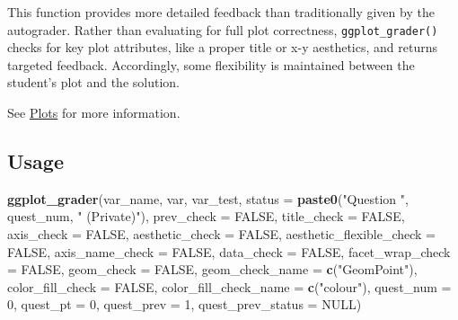 \documentclass[
  12pt,
]{book}
\newenvironment{Shaded}{\begin{snugshade}}{\end{snugshade}}
\newcommand{\AttributeTok}[1]{\textcolor[rgb]{0.13,0.29,0.53}{#1}}
\newcommand{\ConstantTok}[1]{\textcolor[rgb]{0.56,0.35,0.01}{#1}}
\newcommand{\DecValTok}[1]{\textcolor[rgb]{0.00,0.00,0.81}{#1}}
\newcommand{\FunctionTok}[1]{\textcolor[rgb]{0.13,0.29,0.53}{\textbf{#1}}}
\newcommand{\NormalTok}[1]{#1}
\newcommand{\StringTok}[1]{\textcolor[rgb]{0.31,0.60,0.02}{#1}}
\begin{document}
This function provides more detailed feedback than traditionally given by the autograder. Rather than evaluating for full plot correctness, \texttt{ggplot\_grader()} checks for key plot attributes, like a proper title or x-y aesthetics, and returns targeted feedback. Accordingly, some flexibility is maintained between the student's plot and the solution.

See \hyperref[private_grader-plots]{Plots} for more information.

\subsection*{Usage}\label{usage-1}

\begin{Shaded}
\begin{Highlighting}[]
\FunctionTok{ggplot\_grader}\NormalTok{(var\_name, }
\NormalTok{              var, }
\NormalTok{              var\_test, }
              \AttributeTok{status =} \FunctionTok{paste0}\NormalTok{(}\StringTok{"Question "}\NormalTok{, quest\_num, }\StringTok{" (Private)"}\NormalTok{),}
              \AttributeTok{prev\_check =} \ConstantTok{FALSE}\NormalTok{, }
              \AttributeTok{title\_check =} \ConstantTok{FALSE}\NormalTok{, }
              \AttributeTok{axis\_check =} \ConstantTok{FALSE}\NormalTok{, }
              \AttributeTok{aesthetic\_check =} \ConstantTok{FALSE}\NormalTok{, }
              \AttributeTok{aesthetic\_flexible\_check =} \ConstantTok{FALSE}\NormalTok{, }
              \AttributeTok{axis\_name\_check =} \ConstantTok{FALSE}\NormalTok{, }
              \AttributeTok{data\_check =} \ConstantTok{FALSE}\NormalTok{, }
              \AttributeTok{facet\_wrap\_check =} \ConstantTok{FALSE}\NormalTok{, }
              \AttributeTok{geom\_check =} \ConstantTok{FALSE}\NormalTok{, }
              \AttributeTok{geom\_check\_name =} \FunctionTok{c}\NormalTok{(}\StringTok{"GeomPoint"}\NormalTok{), }
              \AttributeTok{color\_fill\_check =} \ConstantTok{FALSE}\NormalTok{, }
              \AttributeTok{color\_fill\_check\_name =} \FunctionTok{c}\NormalTok{(}\StringTok{"colour"}\NormalTok{), }
              \AttributeTok{quest\_num =} \DecValTok{0}\NormalTok{, }
              \AttributeTok{quest\_pt =} \DecValTok{0}\NormalTok{, }
              \AttributeTok{quest\_prev =} \DecValTok{1}\NormalTok{, }
              \AttributeTok{quest\_prev\_status =} \ConstantTok{NULL}\NormalTok{)}
\end{Highlighting}
\end{Shaded}
\end{document}
